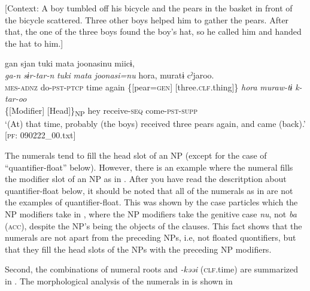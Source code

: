 \ex \label{ex:7:12c}[Context: A boy tumbled off his bicycle and the pears in the basket in front of the bicycle scattered. Three other boys helped him to gather the pears. After that, the one of the three boys found the boy’s hat, so he called him and handed the hat to him.]

{\TM}
\glll gan  sjan  tuki  mata  joonasinu  miicɨ,\\
\textit{ga-n}  \textit{sɨr-tar-n}  \textit{tuki}  \textit{mata}  \textit{joonasi=nu}  \textit{} {\textbar}hora{\textbar},  muratɨ  cˀjaroo.\\
      \textsc{mes}-\textsc{adnz}  do-\textsc{pst}-\textsc{ptcp}  time  again  \{[pear=\textsc{gen}]  [three.\textsc{clf}.thing]\}    \textit{hora}  \textit{muraw-tɨ}  \textit{k-tar-oo}\\
              \{[Modifier]  [Head]\}\textsubscript{NP}    hey  receive-\textsc{seq}  come-\textsc{pst}-\textsc{supp}\\
\glt    ‘(At) that time, probably (the boys) received three pears again, and came (back).’      [\textsc{pf}: 090222\_00.txt]

    \z
\z

The numerals tend to fill the head slot of an NP (except for the case of “quantifier-float” below). However, there is an example where the numeral fills the modifier slot of an NP as in . After you have read the descritption about quantifier-float below, it should be noted that all of the numerals as in  are not the examples of quantifier-float. This was shown by the case particles which the NP modifiers take in , where the NP modifiers take the genitive case \textit{nu}, not \textit{ba} (\textsc{acc}), despite the NP’s being the objects of the clauses. This fact shows that the numerals are not apart from the preceding NPs, i.e, not floated quontifiers, but that they fill the head slots of the NPs with the preceding NP modifiers.

Second, the combinations of numeral roots and \textit{{}-kəəi} (\textsc{clf}.time) are summarized in . The morphological analysis of the numerals in  is shown in 

